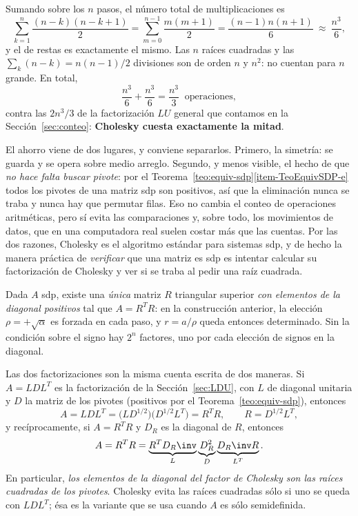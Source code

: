 Sumando sobre los $n$ pasos, el número total de multiplicaciones es
\[
\sum_{k=1}^{n}\frac{(n-k)(n-k+1)}{2}
=\sum_{m=0}^{n-1}\frac{m(m+1)}{2}
=\frac{(n-1)n(n+1)}{6}\ \approx\ \frac{n^3}{6},
\]
y el de restas es exactamente el mismo. Las $n$ raíces cuadradas y las
$\sum_k (n-k)=n(n-1)/2$ divisiones son de orden $n$ y $n^2$: no cuentan para
$n$ grande. En total,
\[
\frac{n^3}{6}+\frac{n^3}{6}=\frac{n^3}{3}\ \text{ operaciones},
\]
contra las $2n^3/3$ de la factorización $LU$ general que contamos en la
Sección~\ref{sec:conteo}: \textbf{Cholesky cuesta exactamente la mitad}.

El ahorro viene de dos lugares, y conviene separarlos. Primero, la simetría:
se guarda y se opera sobre medio arreglo. Segundo, y menos visible, el hecho
de que \emph{no hace falta buscar pivote}: por el
Teorema~\ref{teo:equiv-sdp}\ref{item-TeoEquivSDP-e} todos los pivotes de una
matriz sdp son positivos, así que la eliminación nunca se traba y nunca hay
que permutar filas. Eso no cambia el conteo de operaciones aritméticas, pero
sí evita las comparaciones y, sobre todo, los movimientos de datos, que en una
computadora real suelen costar más que las cuentas. Por las dos razones,
Cholesky es el algoritmo estándar para sistemas sdp, y de hecho la manera
práctica de \emph{verificar} que una matriz es sdp es intentar calcular su
factorización de Cholesky y ver si se traba al pedir una raíz cuadrada.

\begin{remark}[Unicidad]
  Dada $A$ sdp, existe una \emph{única} matriz $R$ triangular superior
  \emph{con elementos de la diagonal positivos} tal que $A = R^T R$: en la
  construcción anterior, la elección $\rho=+\sqrt\alpha$ es forzada en cada
  paso, y $r=a/\rho$ queda entonces determinado. Sin la condición sobre el
  signo hay $2^n$ factores, uno por cada elección de signos en la diagonal.
\end{remark}

\begin{remark}
  Las dos factorizaciones son la misma cuenta escrita de dos maneras. Si
  $A=LDL^T$ es la factorización de la Sección~\ref{sec:LDU}, con $L$ de
  diagonal unitaria y $D$ la matriz de los pivotes (positivos por el
  Teorema~\ref{teo:equiv-sdp}), entonces
  \[
  A = LDL^T = \big(LD^{1/2}\big)\big(D^{1/2}L^T\big) = R^TR,
  \qquad R = D^{1/2}L^T ,
  \]
  y recíprocamente, si $A=R^TR$ y $D_R$ es la diagonal de $R$, entonces
  \[
  A = R^T R = \underbrace{R^T D_R\inv}_{L} \underbrace{D_R^2}_{D}
  \underbrace{D_R\inv R}_{L^T} .
  \]
  En particular, \emph{los elementos de la diagonal del factor de Cholesky son
  las raíces cuadradas de los pivotes}. Cholesky evita las raíces cuadradas
  sólo si uno se queda con $LDL^T$; ésa es la variante que se usa cuando $A$
  es sólo semidefinida.
\end{remark}

